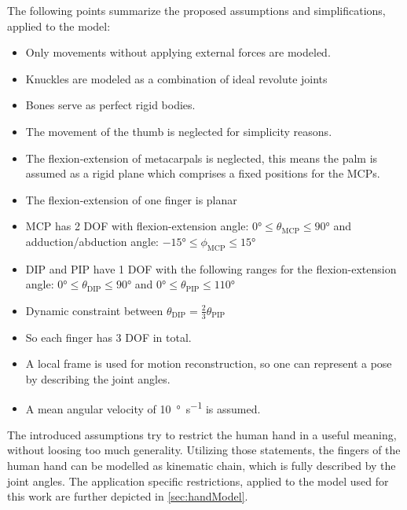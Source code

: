 The following points summarize the proposed assumptions and simplifications, applied to the model:
\begin{itemize}
\item Only movements without applying external forces are modeled.
\item Knuckles are modeled as a combination of ideal revolute joints
\item Bones serve as perfect rigid bodies.
\item The movement of the thumb is neglected for simplicity reasons.
\item The flexion-extension of metacarpals is neglected, this means the palm is assumed as a rigid plane which comprises a fixed positions for the \acp{MCP}.
\item The flexion-extension of one finger is planar
\item \ac{MCP} has 2 \ac{DOF} with flexion-extension angle: $ \ang{0} \leq \theta_{\mathrm{MCP}} \leq \ang{90} $ and adduction/abduction angle: $ \ang{-15} \leq \phi_{\mathrm{MCP}} \leq \ang{+15} $
\item \ac{DIP} and \ac{PIP} have 1 DOF with the following ranges for the flexion-extension angle: $ \ang{0} \leq \theta_{\mathrm{DIP}} \leq \ang{90} $ and $ \ang{0} \leq \theta_{\mathrm{PIP}} \leq \ang{110} $
\item Dynamic constraint between $ \theta_{\mathrm{DIP}} = \frac{2}{3} \theta_{\mathrm{PIP}} $
\item So each finger has 3 \ac{DOF} in total.
\item A local frame is used for motion reconstruction, so one can represent a pose by describing the joint angles.
\item A mean angular velocity of \SI[per-mode=symbol]{10}{\degree \per \second} is assumed.
\end{itemize}

The introduced assumptions try to restrict the human hand in a useful meaning, without loosing too much generality. Utilizing those statements, the fingers of the human hand can be modelled as kinematic chain, which is fully described by the joint angles. The application specific restrictions, applied to the model used for this work are further depicted in \ref{sec:handModel}.

\FloatBarrier

